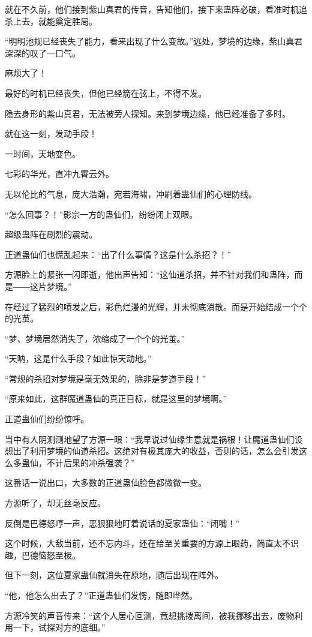 \begin{this_body}
就在不久前，他们接到紫山真君的传音，告知他们，接下来蛊阵必破，看准时机追杀上去，就能奠定胜局。

“明明池规已经丧失了能力，看来出现了什么变故。”远处，梦境的边缘，紫山真君深深的叹了一口气。

麻烦大了！

最好的时机已经丧失，但他已经箭在弦上，不得不发。

隐去身形的紫山真君，无法被旁人探知。来到梦境边缘，他已经准备了多时。

就在这一刻，发动手段！

一时间，天地变色。

七彩的华光，直冲九霄云外。

无以伦比的气息，庞大浩瀚，宛若海啸，冲刷着蛊仙们的心理防线。

“怎么回事？！”影宗一方的蛊仙们，纷纷闭上双眼。

超级蛊阵在剧烈的震动。

正道蛊仙们也慌乱起来：“出了什么事情？这是什么杀招？！”

方源脸上的紧张一闪即逝，他出声告知：“这仙道杀招，并不针对我们和蛊阵，而是――这片梦境。”

在经过了猛烈的喷发之后，彩色烂漫的光辉，并未彻底消散。而是开始结成一个个的光茧。

“梦、梦境居然消失了，浓缩成了一个个的光茧。”

“天呐，这是什么手段？如此惊天动地。”

“常规的杀招对梦境是毫无效果的，除非是梦道手段！”

“原来如此，这群魔道蛊仙的真正目标，就是这里的梦境啊。”

正道蛊仙们纷纷惊呼。

当中有人阴测测地望了方源一眼：“我早说过仙缘生意就是祸根！让魔道蛊仙们设想出了利用梦境的仙道杀招。这绝对有极其庞大的收益，否则的话，怎么会引发这么多蛊仙，不计后果的冲杀强袭？”

这番话一说出口，大多数的正道蛊仙脸色都微微一变。

方源听了，却无丝毫反应。

反倒是巴德怒哼一声，恶狠狠地盯着说话的夏家蛊仙：“闭嘴！”

这个时候，大敌当前，还不忘内斗，还在给至关重要的方源上眼药，简直太不识趣，巴德恼怒至极。

但下一刻，这位夏家蛊仙就消失在原地，随后出现在阵外。

“他，他怎么出去了？”正道蛊仙们发愣，随即哗然。

方源冷笑的声音传来：“这个人居心叵测，竟想挑拨离间，被我挪移出去，废物利用一下，试探对方的底细。”


\end{this_body}
